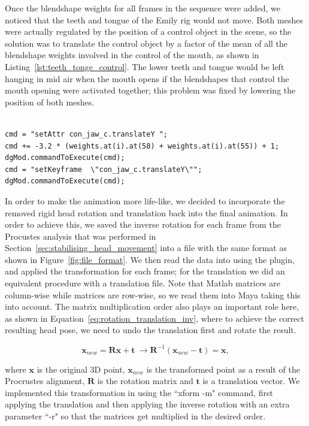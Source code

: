 Once the blendshape weights for all frames in the sequence were added, we noticed that the teeth and tongue of the Emily rig would not move.
Both meshes were actually regulated by the position of a control object in the scene, so the solution was to translate the control object by a factor of the mean of all the blendshape weights involved in the control of the mouth, as shown in Listing~\ref{lst:teeth_tonge_control}.
The lower teeth and tongue would be left hanging in mid air when the mouth opens if the blendshapes that control the mouth opening were activated together; this problem was fixed by lowering the position of both meshes.

\begin{lstlisting}[caption = Teeth and tongue control based on relevant weights., label = lst:teeth_tonge_control, frame=single]

cmd = "setAttr con_jaw_c.translateY ";
cmd += -3.2 * (weights.at(i).at(58) + weights.at(i).at(55)) + 1;
dgMod.commandToExecute(cmd);
cmd = "setKeyframe  \"con_jaw_c.translateY\"";
dgMod.commandToExecute(cmd);
\end{lstlisting}

In order to make the animation more life-like, we decided to incorporate the removed rigid head rotation and translation back into the final animation.
In order to achieve this, we saved the inverse rotation for each frame from the Procustes analysis that was performed in Section~\ref{sec:stabilising_head_movement} into a file with the same format as shown in Figure~\ref{fig:file_format}.
We then read the data into \Maya using the plugin, and applied the transformation for each frame; for the translation we did an equivalent procedure with a translation file.
Note that Matlab matrices are column-wise while \Maya matrices are row-wise, so we read them into Maya taking this into account.
The matrix multiplication order also plays an important role here, as shown in Equation~\ref{eq:rotation_translation_inv}, where to achieve the correct resulting head pose, we need to undo the translation first and rotate the result.

\begin{equation}
\mathbf{x}_{new} = \mathbf{R} \mathbf{x} + \mathbf{t} ~ \rightarrow  \mathbf{R}^{-1}(\mathbf{x}_{new} - \mathbf{t}) = \mathbf{x},
\label{eq:rotation_translation_inv}
\end{equation}

where $\mathbf{x}$ is the original 3D point, $\mathbf{x}_{new}$ is the transformed point as a result of the Procrustes alignment, $\mathbf{R}$ is the rotation matrix and $\mathbf{t}$ is a translation vector.
We implemented this transformation in \Maya using the ``xform -m" command, first applying the translation and then applying the inverse rotation with an extra parameter ``-r" so that the matrices get multiplied in the desired order.

